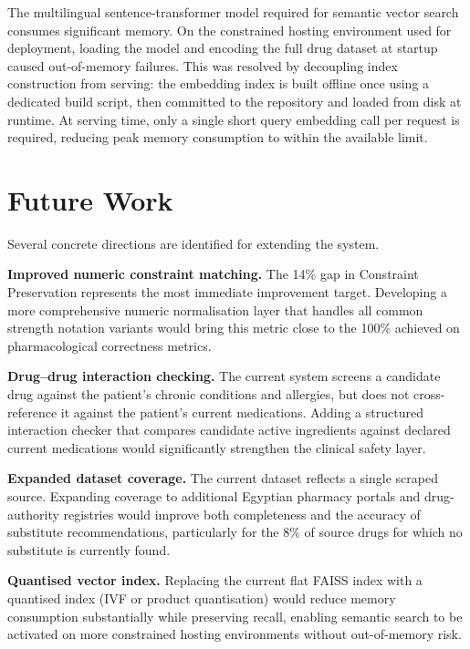 \documentclass[12pt,a4paper]{article}
\begin{document}
The multilingual sentence-transformer model required for semantic vector
search consumes significant memory. On the constrained hosting environment
used for deployment, loading the model and encoding the full drug dataset
at startup caused out-of-memory failures. This was resolved by decoupling
index construction from serving: the embedding index is built offline once
using a dedicated build script, then committed to the repository and loaded
from disk at runtime. At serving time, only a single short query embedding
call per request is required, reducing peak memory consumption to within
the available limit.

\section{Future Work}

Several concrete directions are identified for extending the system.

\textbf{Improved numeric constraint matching.} The 14\% gap in Constraint
Preservation represents the most immediate improvement target. Developing
a more comprehensive numeric normalisation layer that handles all common
strength notation variants would bring this metric close to the 100\%
achieved on pharmacological correctness metrics.

\textbf{Drug--drug interaction checking.} The current system screens a
candidate drug against the patient's chronic conditions and allergies, but
does not cross-reference it against the patient's current medications.
Adding a structured interaction checker that compares candidate active
ingredients against declared current medications would significantly
strengthen the clinical safety layer.

\textbf{Expanded dataset coverage.} The current dataset reflects a single
scraped source. Expanding coverage to additional Egyptian pharmacy portals
and drug-authority registries would improve both completeness and the accuracy
of substitute recommendations, particularly for the 8\% of source drugs for
which no substitute is currently found.

\textbf{Quantised vector index.} Replacing the current flat FAISS index with
a quantised index (IVF or product quantisation) would reduce memory consumption
substantially while preserving recall, enabling semantic search to be activated
on more constrained hosting environments without out-of-memory risk.
\end{document}
